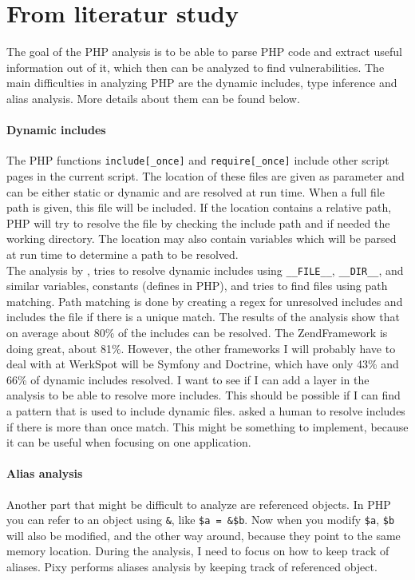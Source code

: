 \documentclass[../main.tex]{subfiles}
\begin{document}
    \section{From literatur study}
    \label{phpdynamics}
The goal of the PHP analysis is to be able to parse PHP code and extract useful information out of it, which then can be analyzed to find vulnerabilities.
The main difficulties in analyzing PHP are the dynamic includes, type inference and alias analysis. 
More details about them can be found below.
\paragraph{Dynamic includes}
\label{includes}
The PHP functions \texttt{include[\_once]} and \texttt{require[\_once]} include other script pages in the current script.
The location of these files are given as parameter and can be either static or dynamic and are resolved at run time.
When a full file path is given, this file will be included.
If the location contains a relative path, PHP will try to resolve the file by checking the include path and if needed the working directory.
The location may also contain variables which will be parsed at run time to determine a path to be resolved.
\\
The analysis by  \autocite{Hil:12}, tries to resolve dynamic includes using \texttt{\_\_FILE\_\_}, \texttt{\_\_DIR\_\_}, and similar variables, constants (defines in PHP), and tries to find files using path matching.
Path matching is done by creating a regex for unresolved includes and includes the file if there is a unique match.
The results of the analysis show that on average about 80\% of the includes can be resolved.
The ZendFramework is doing great, about 81\%. However, the other frameworks I will probably have to deal with at WerkSpot will be Symfony and Doctrine, which have only 43\% and 66\% of dynamic includes resolved. 
I want to see if I can add a layer in the analysis to be able to resolve more includes. 
This should be possible if I can find a pattern that is used to include dynamic files.
 \autocite{Son:11} asked a human to resolve includes if there is more than once match.
This might be something to implement, because it can be useful when focusing on one application.

\paragraph{Alias analysis}
\label{alias}
Another part that might be difficult to analyze are referenced objects.
In PHP you can refer to an object using \texttt{\&}, like \texttt{\$a = \&\$b}.
Now when you modify \texttt{\$a}, \texttt{\$b} will also be modified, and the other way around, because they point to the same memory location.
During the analysis, I need to focus on how to keep track of aliases. 
Pixy \autocite{Jov:06} performs aliases analysis by keeping track of referenced object.
\end{document}
